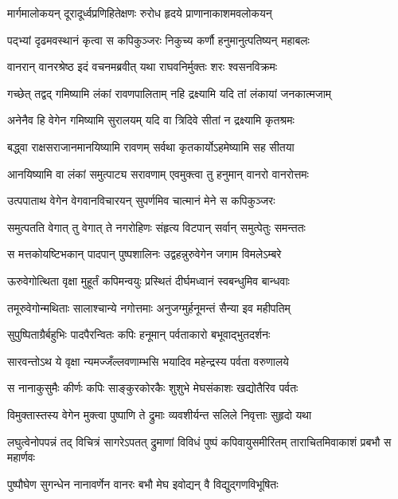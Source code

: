 \twolineshloka
{मार्गमालोकयन् दूरादूर्ध्वप्रणिहितेक्षणः}
{रुरोध हृदये प्राणानाकाशमवलोकयन्} %

\twolineshloka
{पद्भ्यां दृढमवस्थानं कृत्वा स कपिकुञ्जरः}
{निकुच्य कर्णौ हनुमानुत्पतिष्यन् महाबलः} %

\twolineshloka
{वानरान् वानरश्रेष्ठ इदं वचनमब्रवीत्}
{यथा राघवनिर्मुक्तः शरः श्वसनविक्रमः} %

\twolineshloka
{गच्छेत् तद्वद् गमिष्यामि लंकां रावणपालिताम्}
{नहि द्रक्ष्यामि यदि तां लंकायां जनकात्मजाम्} %

\twolineshloka
{अनेनैव हि वेगेन गमिष्यामि सुरालयम्}
{यदि वा त्रिदिवे सीतां न द्रक्ष्यामि कृतश्रमः} %

\twolineshloka
{बद्ध्वा राक्षसराजानमानयिष्यामि रावणम्}
{सर्वथा कृतकार्योऽहमेष्यामि सह सीतया} %

\twolineshloka
{आनयिष्यामि वा लंकां समुत्पाट्य सरावणाम्}
{एवमुक्त्वा तु हनुमान् वानरो वानरोत्तमः} %

\twolineshloka
{उत्पपाताथ वेगेन वेगवानविचारयन्}
{सुपर्णमिव चात्मानं मेने स कपिकुञ्जरः} %

\twolineshloka
{समुत्पतति वेगात् तु वेगात् ते नगरोहिणः}
{संहृत्य विटपान् सर्वान् समुत्पेतुः समन्ततः} %

\twolineshloka
{स मत्तकोयष्टिभकान् पादपान् पुष्पशालिनः}
{उद्वहन्नुरुवेगेन जगाम विमलेऽम्बरे} %

\twolineshloka
{ऊरुवेगोत्थिता वृक्षा मुहूर्तं कपिमन्वयुः}
{प्रस्थितं दीर्घमध्वानं स्वबन्धुमिव बान्धवाः} %

\twolineshloka
{तमूरुवेगोन्मथिताः सालाश्चान्ये नगोत्तमाः}
{अनुजग्मुर्हनूमन्तं सैन्या इव महीपतिम्} %

\twolineshloka
{सुपुष्पिताग्रैर्बहुभिः पादपैरन्वितः कपिः}
{हनूमान् पर्वताकारो बभूवाद्भुतदर्शनः} %

\twolineshloka
{सारवन्तोऽथ ये वृक्षा न्यमज्जँल्लवणाम्भसि}
{भयादिव महेन्द्रस्य पर्वता वरुणालये} %

\twolineshloka
{स नानाकुसुमैः कीर्णः कपिः साङ्कुरकोरकैः}
{शुशुभे मेघसंकाशः खद्योतैरिव पर्वतः} %

\twolineshloka
{विमुक्तास्तस्य वेगेन मुक्त्वा पुष्पाणि ते द्रुमाः}
{व्यवशीर्यन्त सलिले निवृत्ताः सुहृदो यथा} %

\threelineshloka
{लघुत्वेनोपपन्नं तद् विचित्रं सागरेऽपतत्}
{द्रुमाणां विविधं पुष्पं कपिवायुसमीरितम्}
{ताराचितमिवाकाशं प्रबभौ स महार्णवः} %

\twolineshloka
{पुष्पौघेण सुगन्धेन नानावर्णेन वानरः}
{बभौ मेघ इवोद्यन् वै विद्युद्गणविभूषितः} %

